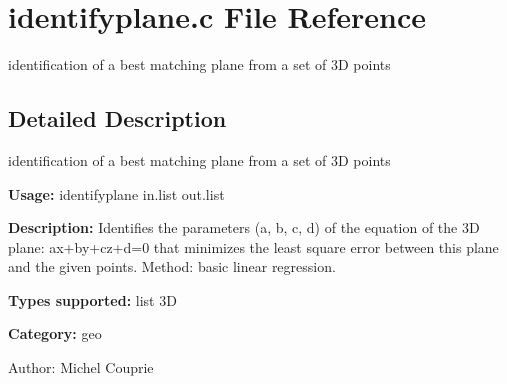 \section{identifyplane.c File Reference}
\label{identifyplane_8c}
identification of a best matching plane from a set of 3D points  




\label{_details}
\subsection{Detailed Description}
identification of a best matching plane from a set of 3D points 

{\bf Usage:} identifyplane in.list out.list

{\bf Description:} Identifies the parameters (a, b, c, d) of the equation of the 3D plane: ax+by+cz+d=0 that minimizes the least square error between this plane and the given points. Method: basic linear regression.

{\bf Types supported:} list 3D

{\bf Category:} geo

\begin{Desc}
\item[Author:]Michel Couprie \end{Desc}
